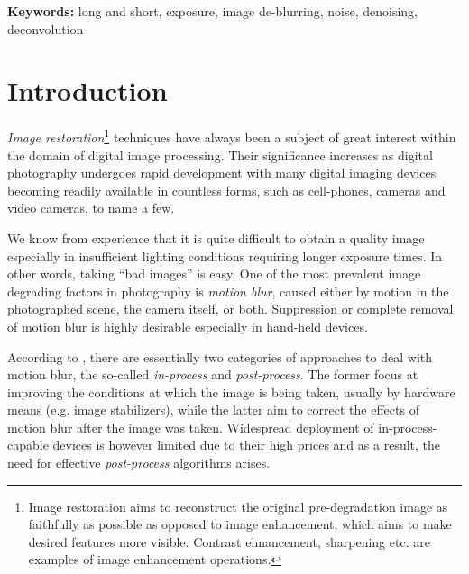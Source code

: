 \documentclass[12pt,notitlepage]{report}
\begin{document}
\noindent \textbf{Keywords:} long and short, exposure, image de-blurring, noise, denoising, deconvolution

\clearpage


\addtolength{\parskip}{.5\baselineskip}

\chapter{Introduction}
\label{chap:introduction}

{\em Image restoration}\footnote[1]{Image restoration aims to reconstruct the original pre-degradation image as faithfully as possible as opposed to image enhancement, which aims to make desired features more visible. Contrast ehnancement, sharpening etc. are examples of image enhancement operations.} techniques have always been a subject of great interest within the domain of digital image processing. Their significance increases as digital photography undergoes rapid development with many digital imaging devices becoming readily available in countless forms, such as cell-phones, cameras and video cameras, to name a few. 

We know from experience that it is quite difficult to obtain a quality image especially in insufficient lighting conditions requiring longer exposure times. In other words, taking “bad images” is easy. One of the most prevalent image degrading factors in photography is {\em motion blur}, caused either by motion in the photographed scene, the camera itself, or both. Suppression or complete removal of motion blur is highly desirable especially in hand-held devices.

According to \cite{jia04}, there are essentially two categories of approaches to deal with motion blur, the so-called {\em in-process} and {\em post-process}. The former focus at improving the conditions at which the image is being taken, usually by hardware means (e.g. image stabilizers), while the latter aim to correct the effects of motion blur after the image was taken. Widespread deployment of in-process-capable devices is however limited due to their high prices and as a result, the need for effective {\em post-process} algorithms arises.
\end{document}
